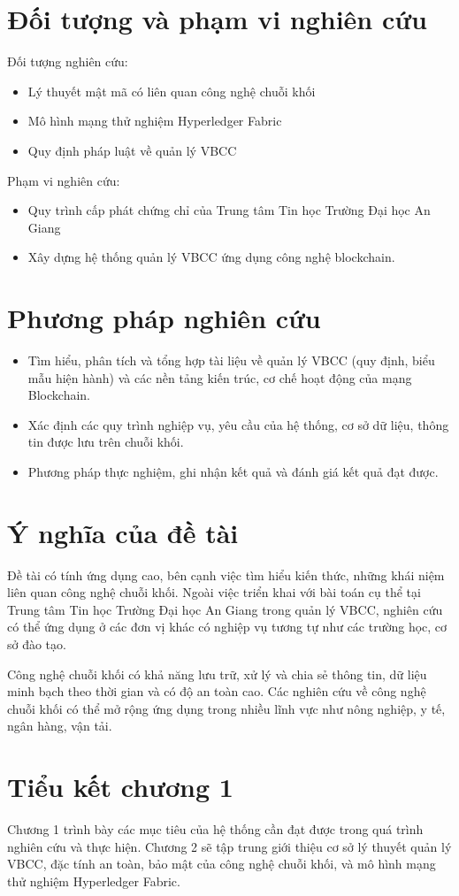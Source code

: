 \section{Đối tượng và phạm vi nghiên cứu}

Đối tượng nghiên cứu:

\begin{itemize}
\item Lý thuyết mật mã có liên quan công nghệ chuỗi khối
\item Mô hình mạng thử nghiệm Hyperledger Fabric
\item Quy định pháp luật về quản lý VBCC
\end{itemize}

Phạm vi nghiên cứu:

\begin{itemize}
\item Quy trình cấp phát chứng chỉ của Trung tâm Tin học Trường Đại học An Giang
\item Xây dựng hệ thống quản lý VBCC ứng dụng công nghệ blockchain.
\end{itemize}

\section{Phương pháp nghiên cứu}

\begin{itemize}
\item Tìm hiểu, phân tích và tổng hợp tài liệu về quản lý VBCC (quy định, biểu mẫu hiện hành) và các nền tảng kiến trúc, cơ chế hoạt động của mạng Blockchain.
\item Xác định các quy trình nghiệp vụ, yêu cầu của hệ thống, cơ sở dữ liệu, thông tin được lưu trên chuỗi khối.
\item Phương pháp thực nghiệm, ghi nhận kết quả và đánh giá kết quả đạt được.
\end{itemize}
\section{Ý nghĩa của đề tài}

Đề tài có tính ứng dụng cao, bên cạnh việc tìm hiểu kiến thức, những khái niệm liên quan công nghệ chuỗi khối.
Ngoài việc triển khai với bài toán cụ thể tại Trung tâm Tin học Trường Đại học An Giang trong quản lý VBCC, nghiên cứu có thể ứng dụng ở các đơn vị khác có nghiệp vụ tương tự như các trường học, cơ sở đào tạo.

Công nghệ chuỗi khối có khả năng lưu trữ, xử lý và chia sẻ thông tin, dữ liệu minh bạch theo thời gian và có độ an toàn cao. Các nghiên cứu về công nghệ chuỗi khối có thể mở rộng ứng dụng trong nhiều lĩnh vực như nông nghiệp, y tế, ngân hàng, vận tải.
\section{Tiểu kết chương 1}

Chương 1 trình bày các mục tiêu của hệ thống cần đạt được trong quá trình nghiên cứu và thực hiện. Chương 2 sẽ tập trung giới thiệu cơ sở lý thuyết quản lý VBCC, đặc tính an toàn, bảo mật của công nghệ chuỗi khối, và mô hình mạng thử nghiệm Hyperledger Fabric.
